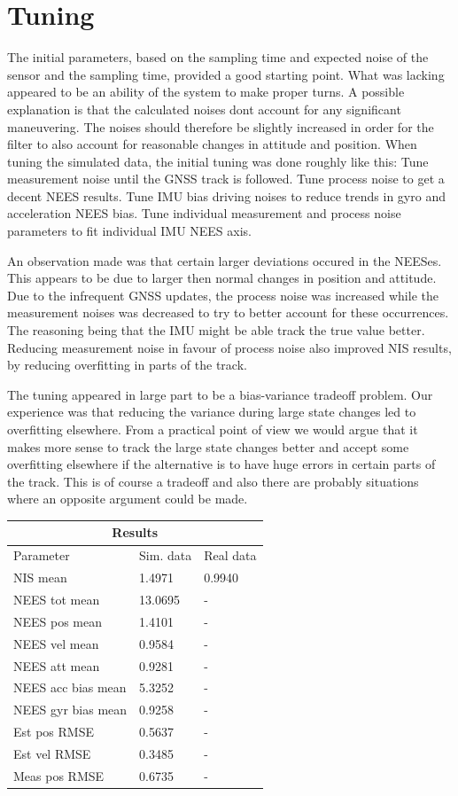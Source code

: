 \section{Tuning}\label{sec:tuning}

The initial parameters, based on the sampling time and expected 
noise of the sensor and the sampling time, provided a good starting point.
What was lacking appeared to be an ability of the system to make proper turns.
A possible explanation is that the calculated noises dont account for
any significant maneuvering. 
The noises should therefore be slightly increased in order for the filter
to also account for reasonable changes in attitude and position.
When tuning the simulated data, the initial tuning was done roughly like this:
Tune measurement noise until the GNSS track is followed.
Tune process noise to get a decent NEES results.
Tune IMU bias driving noises to reduce trends in gyro and acceleration NEES bias.
Tune individual measurement and process noise parameters to fit individual IMU NEES axis.

An observation made was that certain larger deviations occured in the NEESes. 
This appears to be due to larger then normal changes in position and attitude. 
Due to the infrequent GNSS updates, the process noise was increased while
the measurement noises was decreased to try to better account for these occurrences.
The reasoning being that the IMU might be able track the true value better.
Reducing measurement noise in favour of process noise also improved NIS results, 
by reducing overfitting in parts of the track.

The tuning appeared in large part to be a bias-variance tradeoff problem.
Our experience was that reducing the variance during large state changes led to overfitting elsewhere.
From a practical point of view we would argue that it makes more sense to track the large state changes better
and accept some overfitting elsewhere if the alternative is to have huge errors in certain parts of the track.
This is of course a tradeoff and also there are probably situations where an opposite argument could be made.

\begin{tabular}{ |p{5cm}||p{2cm}|p{2cm}|  }
	\hline
	\multicolumn{3}{|c|}{Results} \\
	\hline
	Parameter & Sim. data & Real data\\
	\hline
	NIS mean			& 1.4971  	&   0.9940\\
	NEES tot mean		& 13.0695 	&	-\\
	NEES pos mean 		& 1.4101 	&  -\\
	NEES vel mean		& 0.9584 	& -\\
	NEES att mean		& 0.9281 	& -\\
	NEES acc bias mean	& 5.3252 	& -\\
	NEES gyr bias mean 	& 0.9258 	& -\\
	Est pos RMSE		& 0.5637 	& -\\
	Est vel RMSE		& 0.3485 	& -\\
	Meas pos RMSE		& 0.6735 	& -\\
	\hline
\end{tabular}

